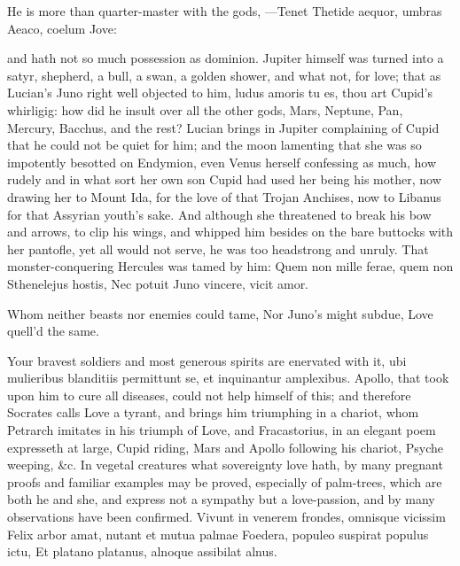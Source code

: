 {He is more than quarter-master with the gods,
---Tenet
Thetide aequor, umbras Aeaco, coelum Jove:

and hath not so much possession as dominion. Jupiter himself was turned
into a satyr, shepherd, a bull, a swan, a golden shower, and what not,
for love; that as Lucian's Juno right well objected to him, ludus
amoris tu es, thou art Cupid's whirligig: how did he insult over all
the other gods, Mars, Neptune, Pan, Mercury, Bacchus, and the rest?
 Lucian brings in Jupiter complaining of Cupid that he could not
be quiet for him; and the moon lamenting that she was so impotently
besotted on Endymion, even Venus herself confessing as much, how rudely
and in what sort her own son Cupid had used her being his mother,
now drawing her to Mount Ida, for the love of that Trojan Anchises, now
to Libanus for that Assyrian youth's sake. And although she threatened
to break his bow and arrows, to clip his wings, and whipped him
besides on the bare buttocks with her pantofle, yet all would not
serve, he was too headstrong and unruly. That monster-conquering
Hercules was tamed by him:
Quem non mille ferae, quem non Sthenelejus hostis,
Nec potuit Juno vincere, vicit amor.

Whom neither beasts nor enemies could tame,
Nor Juno's might subdue, Love quell'd the same.

Your bravest soldiers and most generous spirits are enervated with it,
ubi mulieribus blanditiis permittunt se, et inquinantur
amplexibus. Apollo, that took upon him to cure all diseases,
could not help himself of this; and therefore Socrates
calls Love a tyrant, and brings him triumphing in a chariot, whom
Petrarch imitates in his triumph of Love, and Fracastorius, in an
elegant poem expresseth at large, Cupid riding, Mars and Apollo
following his chariot, Psyche weeping, \&c.
In vegetal creatures what sovereignty love hath, by many pregnant
proofs and familiar examples may be proved, especially of palm-trees,
which are both he and she, and express not a sympathy but a
love-passion, and by many observations have been confirmed.
Vivunt in venerem frondes, omnisque vicissim
Felix arbor amat, nutant et mutua palmae
Foedera, populeo suspirat populus ictu,
Et platano platanus, alnoque assibilat alnus.

}
